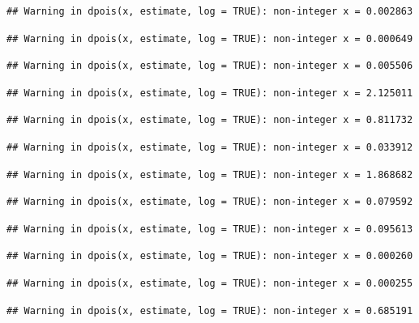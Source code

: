 \documentclass[]{article}
\begin{document}
\begin{verbatim}
## Warning in dpois(x, estimate, log = TRUE): non-integer x = 0.002863
\end{verbatim}

\begin{verbatim}
## Warning in dpois(x, estimate, log = TRUE): non-integer x = 0.000649
\end{verbatim}

\begin{verbatim}
## Warning in dpois(x, estimate, log = TRUE): non-integer x = 0.005506
\end{verbatim}

\begin{verbatim}
## Warning in dpois(x, estimate, log = TRUE): non-integer x = 2.125011
\end{verbatim}

\begin{verbatim}
## Warning in dpois(x, estimate, log = TRUE): non-integer x = 0.811732
\end{verbatim}

\begin{verbatim}
## Warning in dpois(x, estimate, log = TRUE): non-integer x = 0.033912
\end{verbatim}

\begin{verbatim}
## Warning in dpois(x, estimate, log = TRUE): non-integer x = 1.868682
\end{verbatim}

\begin{verbatim}
## Warning in dpois(x, estimate, log = TRUE): non-integer x = 0.079592
\end{verbatim}

\begin{verbatim}
## Warning in dpois(x, estimate, log = TRUE): non-integer x = 0.095613
\end{verbatim}

\begin{verbatim}
## Warning in dpois(x, estimate, log = TRUE): non-integer x = 0.000260
\end{verbatim}

\begin{verbatim}
## Warning in dpois(x, estimate, log = TRUE): non-integer x = 0.000255
\end{verbatim}

\begin{verbatim}
## Warning in dpois(x, estimate, log = TRUE): non-integer x = 0.685191
\end{verbatim}
\end{document}
